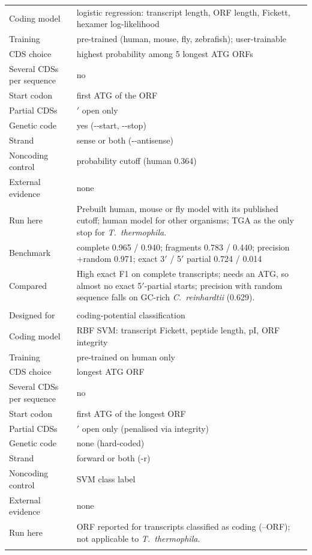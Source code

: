 \begin{longtable}{@{}>{\raggedright}p{3.2cm}>{\raggedright\arraybackslash}p{12.3cm}@{}}
Coding model & logistic regression: transcript length, ORF length, Fickett, hexamer log-likelihood \\*
Training & pre-trained (human, mouse, fly, zebrafish); user-trainable \\*
CDS choice & highest probability among 5 longest ATG ORFs \\*
Several CDSs per sequence & no \\*
Start codon & first ATG of the ORF \\*
Partial CDSs & 3$'$ open only \\*
Genetic code & yes (-{}-start, -{}-stop) \\*
Strand & sense or both (-{}-antisense) \\*
Noncoding control & probability cutoff (human 0.364) \\*
External evidence & none \\*
Run here & Prebuilt human, mouse or fly model with its published cutoff; human model for other organisms; TGA as the only stop for \textit{T.~thermophila}. \\*
Benchmark & complete 0.965 / 0.940; fragments 0.783 / 0.440; precision +random 0.971; exact 3$'$ / 5$'$ partial 0.724 / 0.014 \\*
Compared & High exact F1 on complete transcripts; needs an ATG, so almost no exact 5$'$-partial starts; precision with random sequence falls on GC-rich \textit{C.~reinhardtii} (0.629). \\
\addlinespace[6pt]
\multicolumn{2}{@{}l}{\textbf{CPC2} \citep{Kang2017} (1.0.1)} \\*
Designed for & coding-potential classification \\*
Coding model & RBF SVM: transcript Fickett, peptide length, pI, ORF integrity \\*
Training & pre-trained on human only \\*
CDS choice & longest ATG ORF \\*
Several CDSs per sequence & no \\*
Start codon & first ATG of the longest ORF \\*
Partial CDSs & 3$'$ open only (penalised via integrity) \\*
Genetic code & none (hard-coded) \\*
Strand & forward or both (-r) \\*
Noncoding control & SVM class label \\*
External evidence & none \\*
Run here & ORF reported for transcripts classified as coding (--ORF); not applicable to \textit{T.~thermophila}. \\*

\end{longtable}
